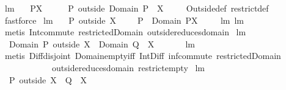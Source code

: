 \begin{isabellebody}
\ lm{}{}{}{\isacharcolon}\ \isanewline
\ \ {\isachardoublequoteopen}P{\isacharbar}{\isacharbar}X\ \ \ {\isacharequal}\ \ \ P\ outside\ {\isacharparenleft}Domain\ P\ {\isacharminus}\ X{\isacharparenright}{\isachardoublequoteclose}\ \isanewline
%
\isadelimproof
\ \ %
\endisadelimproof
%
\isatagproof
{}\isamarkupfalse%
\ Outside{\isacharunderscore}def\ restrict{\isacharunderscore}def\ \isamarkupfalse%
\ fastforce%
\endisatagproof
{\isafoldproof}%
%
\isadelimproof
\isanewline
%
\endisadelimproof
\isanewline
{}\isamarkupfalse%
\ lm{}{}{}{\isacharcolon}\ \isanewline
\ \ {\isachardoublequoteopen}{\isacharparenleft}P\ outside\ X{\isacharparenright}\ {\isasymsubseteq}\ \ \ \ P\ {\isacharbar}{\isacharbar}\ {\isacharparenleft}{\isacharparenleft}Domain\ P{\isacharparenright}{\isacharminus}X{\isacharparenright}{\isachardoublequoteclose}\ \isanewline
%
\isadelimproof
\ \ %
\endisadelimproof
%
\isatagproof
{}\isamarkupfalse%
\ lm{}{}{}\ lm{}{}{}\ \isamarkupfalse%
\ {\isacharparenleft}metis\ Int{\isacharunderscore}commute\ restrictedDomain\ outside{\isacharunderscore}reduces{\isacharunderscore}domain{\isacharparenright}%
\endisatagproof
{\isafoldproof}%
%
\isadelimproof
\isanewline
%
\endisadelimproof
\isanewline
{}\isamarkupfalse%
\ lm{}{}{}{\isacharcolon}\ \isanewline
\ \ {\isachardoublequoteopen}Domain\ {\isacharparenleft}P\ outside\ X{\isacharparenright}\ {\isasyminter}\ Domain\ {\isacharparenleft}Q\ {\isacharbar}{\isacharbar}\ X{\isacharparenright}\ {\isacharequal}\ {\isacharbraceleft}{\isacharbraceright}{\isachardoublequoteclose}\ \isanewline
%
\isadelimproof
\ \ %
\endisadelimproof
%
\isatagproof
{}\isamarkupfalse%
\ lm{}{}{}\isanewline
\ \ \isamarkupfalse%
\ {\isacharparenleft}metis\ Diff{\isacharunderscore}disjoint\ Domain{\isacharunderscore}empty{\isacharunderscore}iff\ Int{\isacharunderscore}Diff\ inf{\isacharunderscore}commute\ restrictedDomain\ \ \ \ \ \isanewline
\ \ \ \ \ \ \ \ \ \ \ \ outside{\isacharunderscore}reduces{\isacharunderscore}domain\ restrict{\isacharunderscore}empty{\isacharparenright}%
\endisatagproof
{\isafoldproof}%
%
\isadelimproof
\isanewline
%
\endisadelimproof
\isanewline
{}\isamarkupfalse%
\ lm{}{}{}{\isacharcolon}\ \isanewline
\ \ {\isachardoublequoteopen}{\isacharparenleft}P\ outside\ X{\isacharparenright}\ {\isasyminter}\ {\isacharparenleft}Q\ {\isacharbar}{\isacharbar}\ X{\isacharparenright}\ {\isacharequal}\ {\isacharbraceleft}{\isacharbraceright}{\isachardoublequoteclose}\ \isanewline

\end{isabellebody}
